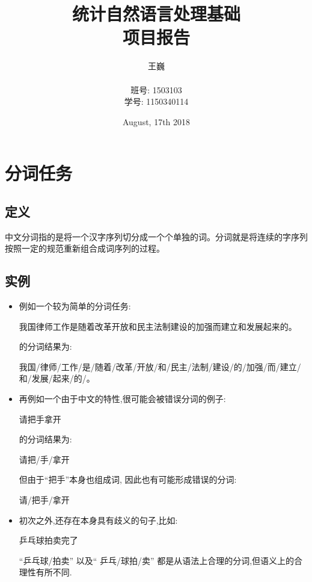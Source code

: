\documentclass[titlepage]{article}
\begin{document}
\title{统计自然语言处理基础 \\ 项目报告}
\date{August, 17th 2018}
\author{王巍 \\ \\班号: 1503103 \\ 学号: 1150340114}
\maketitle

\section{分词任务}
\subsection{定义}
中文分词指的是将一个汉字序列切分成一个个单独的词。分词就是将连续的字序列按照一定的规范重新组合成词序列的过程。\cite{definition}
\subsection{实例}
\begin{itemize}
\item 例如一个较为简单的分词任务:
\begin{center}
我国律师工作是随着改革开放和民主法制建设的加强而建立和发展起来的。
\end{center}

\noindent 的分词结果为:
\begin{center}
我国/律师/工作/是/随着/改革/开放/和/民主/法制/建设/的/加强/而/建立/和/发展/起来/的/。\\[2em]
\end{center}

\item 再例如一个由于中文的特性,很可能会被错误分词的例子:
\begin{center}
请把手拿开
\end{center}

\noindent 的分词结果为:
\begin{center}
请把/手/拿开
\end{center}

\noindent 但由于``把手''本身也组成词, 因此也有可能形成错误的分词:
\begin{center}
请/把手/拿开
\end{center}

\item 初次之外,还存在本身具有歧义的句子,比如:
\begin{center}
乒乓球拍卖完了
\end{center}

``乒乓球/拍卖'' 以及`` 乒乓/球拍/卖'' 都是从语法上合理的分词,但语义上的合理性有所不同.
\end{itemize}
\end{document}

